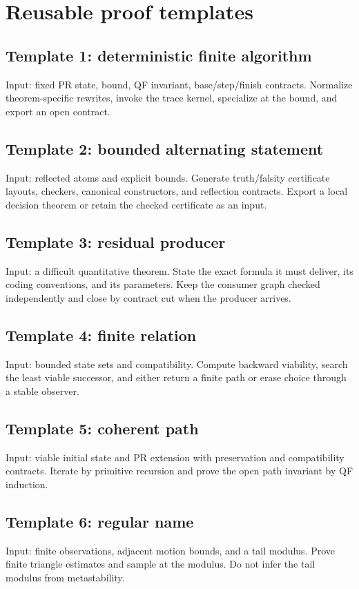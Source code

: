 \section{Reusable proof templates}

\subsection{Template 1: deterministic finite algorithm}
Input: fixed PR state, bound, QF invariant, base/step/finish contracts.  Normalize theorem-specific rewrites, invoke the trace kernel, specialize at the bound, and export an open contract.

\subsection{Template 2: bounded alternating statement}
Input: reflected atoms and explicit bounds.  Generate truth/falsity certificate layouts, checkers, canonical constructors, and reflection contracts.  Export a local decision theorem or retain the checked certificate as an input.

\subsection{Template 3: residual producer}
Input: a difficult quantitative theorem.  State the exact formula it must deliver, its coding conventions, and its parameters.  Keep the consumer graph checked independently and close by contract cut when the producer arrives.

\subsection{Template 4: finite relation}
Input: bounded state sets and compatibility.  Compute backward viability, search the least viable successor, and either return a finite path or erase choice through a stable observer.

\subsection{Template 5: coherent path}
Input: viable initial state and PR extension with preservation and compatibility contracts.  Iterate by primitive recursion and prove the open path invariant by QF induction.

\subsection{Template 6: regular name}
Input: finite observations, adjacent motion bounds, and a tail modulus.  Prove finite triangle estimates and sample at the modulus.  Do not infer the tail modulus from metastability.

